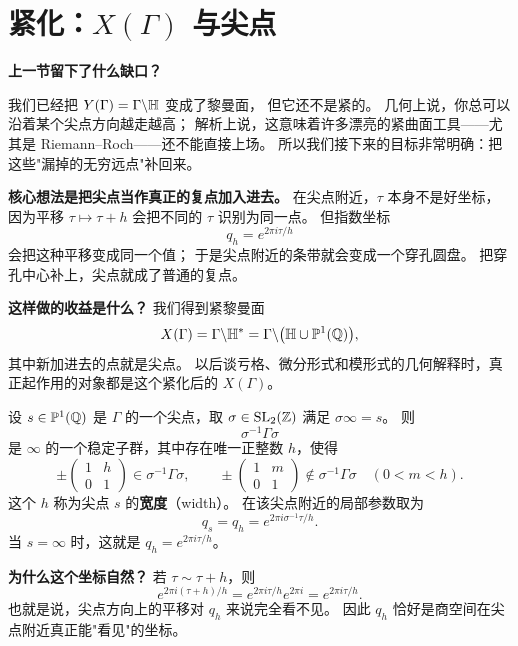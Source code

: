 \section{紧化：$X(\Gamma)$ 与尖点}
\label{sec:compactification}
\label{sec:compactification-X}

\textbf{上一节留下了什么缺口？}

我们已经把 $Y(\Gamma)=\Gamma\backslash\mathbb{H}$ 变成了黎曼面，
但它还不是紧的。
几何上说，你总可以沿着某个尖点方向越走越高；
解析上说，这意味着许多漂亮的紧曲面工具——尤其是 Riemann--Roch——还不能直接上场。
所以我们接下来的目标非常明确：把这些"漏掉的无穷远点"补回来。

\textbf{核心想法是把尖点当作真正的复点加入进去。}
在尖点附近，$\tau$ 本身不是好坐标，
因为平移 $\tau\mapsto\tau+h$ 会把不同的 $\tau$ 识别为同一点。
但指数坐标
\[
  q_h=e^{2\pi i\tau/h}
\]
会把这种平移变成同一个值；
于是尖点附近的条带就会变成一个穿孔圆盘。
把穿孔中心补上，尖点就成了普通的复点。

\textbf{这样做的收益是什么？}
我们得到紧黎曼面
\[
  X(\Gamma)=\Gamma\backslash\mathbb{H}^*=\Gamma\backslash\bigl(\mathbb{H}\cup\mathbb{P}^1(\mathbb{Q})\bigr),
\]
其中新加进去的点就是尖点。
以后谈亏格、微分形式和模形式的几何解释时，真正起作用的对象都是这个紧化后的 $X(\Gamma)$。

\begin{definition}[尖点宽度与局部参数]
\label{def:cusp-width}
设 $s\in\mathbb{P}^1(\mathbb{Q})$ 是 $\Gamma$ 的一个尖点，取
$\sigma\in\mathrm{SL}_2(\mathbb{Z})$ 满足 $\sigma\infty=s$。
则
\[
  \sigma^{-1}\Gamma\sigma
\]
是 $\infty$ 的一个稳定子群，其中存在唯一正整数 $h$，使得
\[
  \pm\begin{pmatrix}1&h\\0&1\end{pmatrix}\in \sigma^{-1}\Gamma\sigma,
  \qquad
  \pm\begin{pmatrix}1&m\\0&1\end{pmatrix}\notin \sigma^{-1}\Gamma\sigma
  \quad (0<m<h).
\]
这个 $h$ 称为尖点 $s$ 的\textbf{宽度}（width）。
在该尖点附近的局部参数取为
\[
  q_s=q_h=e^{2\pi i\sigma^{-1}\tau/h}.
\]
当 $s=\infty$ 时，这就是 $q_h=e^{2\pi i\tau/h}$。
\end{definition}

\textbf{为什么这个坐标自然？}
若 $\tau\sim \tau+h$，则
\[
  e^{2\pi i(\tau+h)/h}=e^{2\pi i\tau/h}e^{2\pi i}=e^{2\pi i\tau/h}.
\]
也就是说，尖点方向上的平移对 $q_h$ 来说完全看不见。
因此 $q_h$ 恰好是商空间在尖点附近真正能"看见"的坐标。

